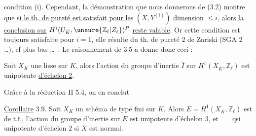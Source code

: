 condition (i). Cependant, la démonstration que nous donnerons  de (3.2) montre que \uline{si le th. de pureté est satisfait pour les} $(X,Y^{(i)})$ \uline{ dimension} $\leq i$, \uline{alors la conclusion sur} $H^i(U_{\bar K},\unsure{\mathbb Z_\ell|Z_\ell})^P$ \uline{reste valable}. Or  cette condition est toujours satisfaite pour $i=1$,  elle résulte du th. de pureté  $2$ de Zariski (SGA 2 \ldots),  cf plus bas \ldots\ . Le raisonnement de 3.5 a donne donc  ceci :

 Soit $X_K$ une    lisse sur $K$, alors l'action du groupe d'inertie $\bar I$ sur $H^1(X_{\bar K},\mathbb Z_\ell)$ est  unipotente \uline{d'échelon 2}.

Grâce à la réduction II 5.4, on en conclut

\uline{Corollaire} 3.9. Soit $X_K$ un schéma  de type fini sur $K$. Alors $E=H^1(X_{\bar K},\mathbb Z_\ell)$ est de t.f.,  l'action du groupe d'inertie sur $E$ est  unipotente d'échelon 3,  et $=$ qsi unipotente d'échelon 2 si $X$ est normal.
